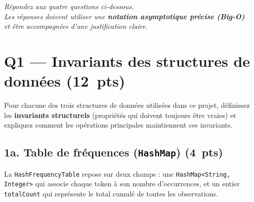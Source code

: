 \documentclass[12pt,a4paper]{article}
\newcommand{\jclass}[1]{\texttt{#1}}
\newcommand{\pts}[1]{\hfill\textbf{\small(#1~pts)}}
\begin{document}
\begin{titlepage}

  \vspace{5mm}
\end{titlepage}

\newpage

{\centering
  \textit{Répondez aux quatre questions ci-dessous.}\\
  \textit{Les réponses doivent utiliser une \textbf{notation asymptotique précise (Big-O)}}\\
  \textit{et être accompagnées d'une justification claire.}
\par}

\vspace{1.5em}

\section{Q1 — Invariants des structures de données \pts{12}}

Pour chacune des trois structures de données utilisées dans ce projet, définissez
les \textbf{invariants structurels} (propriétés qui doivent toujours être vraies)
et expliquez comment les opérations principales maintiennent ces invariants.

\subsection*{1a. Table de fréquences (\jclass{HashMap}) \pts{4}}

La \jclass{HashFrequencyTable} repose sur deux champs : une \jclass{HashMap<String, Integer>}
qui associe chaque token à son nombre d'occurrences, et un entier \texttt{totalCount}
qui représente le total cumulé de toutes les observations.
\end{document}
